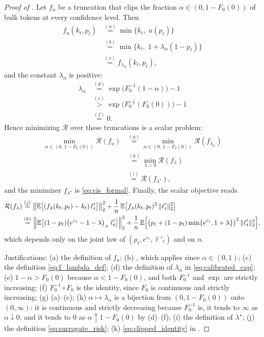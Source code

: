 \begin{proof}[Proof of ]
Let $f_u$ be a truncation that clips the fraction $\alpha\in(0,1-F_0(0))$ of
bulk tokens at every confidence level. Then
\begin{align*}
f_u(k_t,p_t)
&\overset{(a)}{=} \min\big\{k_t,\;u(p_t)\big\}\\
&\overset{(b)}{=} \min\big\{k_t,\;1+\lambda_\alpha(1-p_t)\big\}\\
&\overset{(c)}{=} f_{\lambda_\alpha}(k_t,p_t),
\end{align*}
and the constant $\lambda_\alpha$ is positive:
\begin{align*}
\lambda_\alpha
&\overset{(d)}{=} \exp\!\big(F_0^{-1}(1-\alpha)\big)-1\\
&\overset{(e)}{>} \exp\!\big(F_0^{-1}(F_0(0))\big)-1\\
&\overset{(f)}{=} 0 .
\end{align*}
Hence minimizing $\mathcal R$ over these truncations is a scalar problem:
\begin{align*}
\min_{\alpha\in(0,\,1-F_0(0))}\mathcal R(f_u)
&\overset{(g)}{=} \min_{\alpha\in(0,\,1-F_0(0))}\mathcal R(f_{\lambda_\alpha})\\
&\overset{(h)}{=} \min_{\lambda>0}\mathcal R(f_\lambda)\\
&\overset{(i)}{=} \mathcal R(f_{\lambda^\star}),
\end{align*}
and the minimizer $f_{\lambda^\star}$ is \eqref{eq:cis_formal}. Finally, the
scalar objective reads
\begin{align*}
\mathcal R(f_\lambda)
&\overset{(j)}{=} \big\|\mathbb{E}\big[(f_\lambda(k_t,p_t)-k_t)\,\ell'_t\big]\big\|_2^2
+\frac1n\,\mathbb{E}\big[f_\lambda(k_t,p_t)^2\,\|\ell'_t\|_2^2\big]\\
&\overset{(k)}{=} \Big\|\mathbb{E}\big[(1-p_t)\big(e^{\varepsilon_t}-1-\lambda\big)_+\,\ell'_t\big]\Big\|_2^2
+\frac1n\,\mathbb{E}\Big[\big(p_t+(1-p_t)\min\{e^{\varepsilon_t},1+\lambda\}\big)^2\,\|\ell'_t\|_2^2\Big],
\end{align*}
which depends only on the joint law of $(p_t,e^{\varepsilon_t},\ell'_t)$ and on
$n$.

Justifications:
(a) the definition of $f_u$;
(b) , which applies since $\alpha\in(0,1)$;
(c) the definition \eqref{eq:f_lambda_def};
(d) the definition of $\lambda_\alpha$ in \eqref{eq:calibrated_cap};
(e) $1-\alpha>F_0(0)$ because $\alpha<1-F_0(0)$, and both $F_0^{-1}$ and
$\exp$ are strictly increasing;
(f) $F_0^{-1}\circ F_0$ is the identity, since $F_0$ is continuous and
strictly increasing;
(g) (a)--(c);
(h) $\alpha\mapsto\lambda_\alpha$ is a bijection from $(0,1-F_0(0))$ onto
$(0,\infty)$: it is continuous and strictly decreasing because $F_0^{-1}$ is,
it tends to $\infty$ as $\alpha\downarrow0$, and it tends to $0$ as
$\alpha\uparrow1-F_0(0)$ by (d)--(f);
(i) the definition of $\lambda^\star$;
(j) the definition \eqref{eq:surrogate_risk};
(k) \eqref{eq:clipped_identity} in .
\end{proof}

